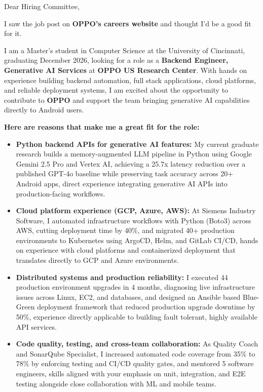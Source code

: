 \documentclass[11pt]{letter}
\date{}
\begin{document}
\begin{letter}{}

\opening{Dear Hiring Committee,}

I saw the job post on \textbf{OPPO's careers website} and thought I'd be a good fit for it.

I am a Master's student in Computer Science at the University of Cincinnati, graduating December 2026, looking for a role as a \textbf{Backend Engineer, Generative AI Services} at \textbf{OPPO US Research Center}. With hands on experience building backend automation, full stack applications, cloud platforms, and reliable deployment systems, I am excited about the opportunity to contribute to \textbf{OPPO} and support the team bringing generative AI capabilities directly to Android users.

\textbf{Here are reasons that make me a great fit for the role:}

\begin{itemize}[leftmargin=*, itemsep=0.45em]
    \item \textbf{Python backend APIs for generative AI features:} My current graduate research builds a memory-augmented LLM pipeline in Python using Google Gemini 2.5 Pro and Vertex AI, achieving a 25.7x latency reduction over a published GPT-4o baseline while preserving task accuracy across 20+ Android apps, direct experience integrating generative AI APIs into production-facing workflows.

    \item \textbf{Cloud platform experience (GCP, Azure, AWS):} At Siemens Industry Software, I automated infrastructure workflows with Python (Boto3) across AWS, cutting deployment time by 40\%, and migrated 40+ production environments to Kubernetes using ArgoCD, Helm, and GitLab CI/CD, hands on experience with cloud platforms and containerized deployment that translates directly to GCP and Azure environments.

    \item \textbf{Distributed systems and production reliability:} I executed 44 production environment upgrades in 4 months, diagnosing live infrastructure issues across Linux, EC2, and databases, and designed an Ansible based Blue-Green deployment framework that reduced production upgrade downtime by 50\%, experience directly applicable to building fault tolerant, highly available API services.

    \item \textbf{Code quality, testing, and cross-team collaboration:} As Quality Coach and SonarQube Specialist, I increased automated code coverage from 35\% to 78\% by enforcing testing and CI/CD quality gates, and mentored 5 software engineers, skills aligned with your emphasis on unit, integration, and E2E testing alongside close collaboration with ML and mobile teams.
\end{itemize}


\end{letter}
\end{document}
